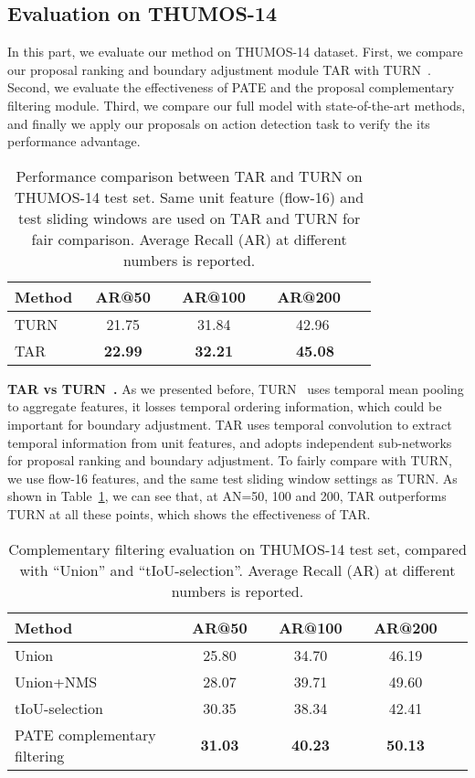 \documentclass[runningheads]{llncs}
\begin{document}
\subsection{Evaluation on THUMOS-14}
In this part, we evaluate our method on THUMOS-14 dataset. First, we compare our proposal ranking and boundary adjustment module TAR with TURN~\cite{Gao_2017_ICCV}. Second, we evaluate the effectiveness of PATE and the proposal complementary filtering module. Third, we compare our full model with state-of-the-art methods, and finally we apply our proposals on action detection task to verify the its performance advantage.

\begin{table}
\centering
\caption{Performance comparison between TAR and TURN \cite{Gao_2017_ICCV} on THUMOS-14 test set. Same unit feature (flow-16) and test sliding windows are used on TAR and TURN for fair comparison. Average Recall (AR) at different numbers is reported.}
\label{tbl: TAR}
\begin{tabular}{l|cccc}
\toprule
 Method &\ AR@50\ &\ AR@100\ &\ AR@200\ &\\ \midrule
TURN\cite{Gao_2017_ICCV}\ \ &\ 21.75\ &\ 31.84\ &\ 42.96 \\ 
TAR &\ \textbf{22.99}\ &\ \textbf{32.21}\ &\ \textbf{ 45.08}\\ \bottomrule
\end{tabular}
\end{table}

\textbf{TAR vs TURN~\cite{Gao_2017_ICCV}.} As we presented before, TURN~\cite{Gao_2017_ICCV} uses temporal mean pooling to aggregate features, it losses temporal ordering information, which could be important for boundary adjustment. TAR uses temporal convolution to extract temporal information from unit features, and adopts independent sub-networks for proposal ranking and boundary adjustment. To fairly compare with TURN, we use flow-16 features, and the same test sliding window settings as TURN. As shown in Table~\ref{tbl: TAR}, we can see that, at AN=50, 100 and 200, TAR outperforms TURN at all these points, which shows the effectiveness of TAR.

\begin{table}[b]
\centering
\caption{Complementary filtering evaluation on THUMOS-14 test set, compared with ``Union'' and ``tIoU-selection''. Average Recall (AR)  at different numbers is reported.}
\label{tbl: fusion}
\begin{tabular}{l|cccc}
\toprule
Method &\ AR@50\ &\ AR@100\ &\ AR@200\ \\ \midrule
Union & \ 25.80\ &\ 34.70\ &\ 46.19\ \\ 
Union+NMS & \ 28.07\ &\ 39.71\ &\ 49.60\ \\ 
tIoU-selection &\ 30.35\ &\ 38.34\ &\ 42.41\ \\
PATE complementary filtering\ \ \ &\ \textbf{31.03}\ &\ \textbf{40.23}\ &\ \textbf{50.13}\ \\ \bottomrule
\end{tabular}
\end{table}
\end{document}
